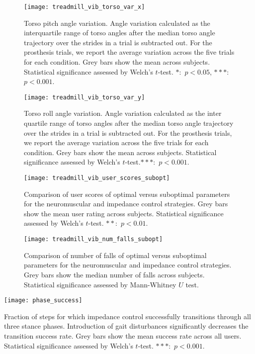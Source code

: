 \begin{figure}[h]
    \centering 
    \texttt{[image: treadmill\_vib\_torso\_var\_x]}
    \caption{Torso pitch angle variation. Angle variation calculated as the
    interquartile range of torso angles after the median torso angle trajectory
    over the strides in a trial is subtracted out. For the prosthesis trials, we
    report the average variation across the five trials for each condition.
    Grey bars show the mean across subjects.  Statistical significance assessed
    by Welch's $t$-test. $*$:~$p < 0.05$, $***$:~$p <
    0.001$.}\label{fig:treadmill_exp_torso_var_x}
\end{figure}

\begin{figure}[h]
    \centering 
    \texttt{[image: treadmill\_vib\_torso\_var\_y]}
    \caption{Torso roll angle variation. Angle variation calculated as the inter
    quartile range of torso angles after the median torso angle trajectory over
    the strides in a trial is subtracted out. For the prosthesis trials, we
    report the average variation across the five trials for each condition.
    Grey bars show the mean across subjects.  Statistical significance assessed
    by Welch's $t$-test.$***$:~$p < 0.001$.}\label{fig:treadmill_exp_torso_var_y}
\end{figure}

\begin{figure}[h]
    \centering 
    \texttt{[image: treadmill\_vib\_user\_scores\_subopt]}
    \caption{Comparison of user scores of optimal versus suboptimal parameters
    for the neuromuscular and impedance control strategies. Grey bars show the
    mean user rating across subjects. Statistical significance assessed by
    Welch's $t$-test. $**$:~$p <
    0.01$.}\label{fig:treadmill_exp_user_ratings_subopt}
\end{figure}

\begin{figure}[h]
    \centering 
    \texttt{[image: treadmill\_vib\_num\_falls\_subopt]}
    \caption{Comparison of number of falls of optimal versus suboptimal
    parameters for the neuromuscular and impedance control strategies. Grey bars
    show the median number of falls across subjects. Statistical significance
    assessed by Mann-Whitney $U$
    test.}\label{fig:treadmill_exp_user_ratings_subopt}
\end{figure}

\begin{marginfigure}
    \centering 
    \texttt{[image: phase\_success]}
    \caption{Fraction of steps for which impedance control successfully
    transitions through all three stance phases. Introduction of gait
    disturbances significantly decreases the transition success rate. Grey bars
    show the mean success rate across all users. Statistical significance
    assessed by Welch's $t$-test. $***$:~$p <
    0.001$.}\label{fig:treadmill_exp_phase_success}
\end{marginfigure}
